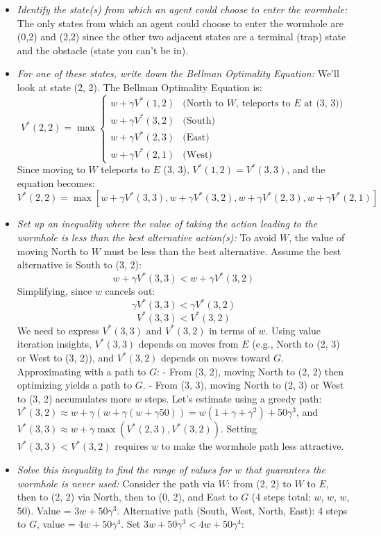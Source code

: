 \documentclass{article}
\begin{document}
\begin{itemize}
    \item \textit{Identify the state(s) from which an agent could choose to enter the wormhole:} The only states from which an agent could choose to enter the wormhole are (0,2) and (2,2) since the other two adjacent states are a terminal (trap) state and the obstacle (state you can't be in).
    \item \textit{For one of these states, write down the Bellman Optimality Equation:} We'll look at state (2, 2). The Bellman Optimality Equation is:
      \[
      V^*(2, 2) = \max \begin{cases} 
      w + \gamma V^*(1, 2) & \text{(North to $W$, teleports to $E$ at (3, 3))} \\
      w + \gamma V^*(3, 2) & \text{(South)} \\
      w + \gamma V^*(2, 3) & \text{(East)} \\
      w + \gamma V^*(2, 1) & \text{(West)}
      \end{cases}
      \]
      Since moving to $W$ teleports to $E$ (3, 3), $V^*(1, 2) = V^*(3, 3)$, and the equation becomes:
      \[
      V^*(2, 2) = \max \left[ w + \gamma V^*(3, 3), w + \gamma V^*(3, 2), w + \gamma V^*(2, 3), w + \gamma V^*(2, 1) \right]
      \]
    \item \textit{Set up an inequality where the value of taking the action leading to the wormhole is less than the best alternative action(s):} To avoid $W$, the value of moving North to $W$ must be less than the best alternative. Assume the best alternative is South to (3, 2):
      \[
      w + \gamma V^*(3, 3) < w + \gamma V^*(3, 2)
      \]
      Simplifying, since $w$ cancels out:
      \[
      \gamma V^*(3, 3) < \gamma V^*(3, 2)
      \]
      \[
      V^*(3, 3) < V^*(3, 2)
      \]
      We need to express $V^*(3, 3)$ and $V^*(3, 2)$ in terms of $w$. Using value iteration insights, $V^*(3, 3)$ depends on moves from $E$ (e.g., North to (2, 3) or West to (3, 2)), and $V^*(3, 2)$ depends on moves toward $G$. Approximating with a path to $G$:
      - From (3, 2), moving North to (2, 2) then optimizing yields a path to $G$.
      - From (3, 3), moving North to (2, 3) or West to (3, 2) accumulates more $w$ steps.
      Let’s estimate using a greedy path: $V^*(3, 2) \approx w + \gamma (w + \gamma (w + \gamma 50)) = w (1 + \gamma + \gamma^2) + 50 \gamma^3$, and $V^*(3, 3) \approx w + \gamma \max(V^*(2, 3), V^*(3, 2))$. Setting $V^*(3, 3) < V^*(3, 2)$ requires $w$ to make the wormhole path less attractive.
    \item \textit{Solve this inequality to find the range of values for $w$ that guarantees the wormhole is never used:} Consider the path via $W$: from (2, 2) to $W$ to $E$, then to (2, 2) via North, then to (0, 2), and East to $G$ (4 steps total: $w$, $w$, $w$, $50$). Value = $3w + 50 \gamma^3$. Alternative path (South, West, North, East): 4 steps to $G$, value = $4w + 50 \gamma^4$. Set $3w + 50 \gamma^3 < 4w + 50 \gamma^4$:

\end{itemize}
\end{document}
